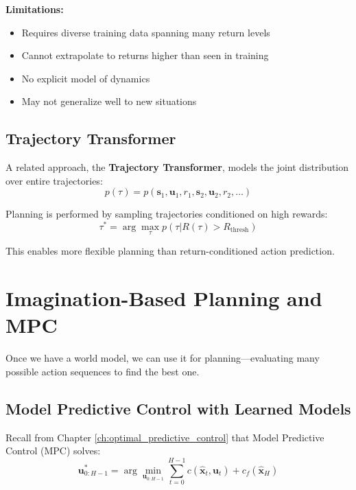 \textbf{Limitations:}
\begin{itemize}
    \item Requires diverse training data spanning many return levels
    \item Cannot extrapolate to returns higher than seen in training
    \item No explicit model of dynamics
    \item May not generalize well to new situations
\end{itemize}

\subsection{Trajectory Transformer}

A related approach, the \textbf{Trajectory Transformer}, models the joint distribution over entire trajectories:
\begin{equation}
p(\tau) = p(\mathbf{s}_1, \mathbf{u}_1, r_1, \mathbf{s}_2, \mathbf{u}_2, r_2, \ldots)
\end{equation}

Planning is performed by sampling trajectories conditioned on high rewards:
\begin{equation}
\tau^* = \arg\max_\tau p(\tau | R(\tau) > R_{\text{thresh}})
\end{equation}

This enables more flexible planning than return-conditioned action prediction.

\section{Imagination-Based Planning and MPC}
\label{sec:imagination_planning}

Once we have a world model, we can use it for planning---evaluating many possible action sequences to find the best one.

\subsection{Model Predictive Control with Learned Models}

Recall from Chapter \ref{ch:optimal_predictive_control} that Model Predictive Control (MPC) solves:
\begin{equation}
\mathbf{u}_{0:H-1}^* = \arg\min_{\mathbf{u}_{0:H-1}} \sum_{t=0}^{H-1} c(\hat{\mathbf{x}}_t, \mathbf{u}_t) + c_f(\hat{\mathbf{x}}_H)
\end{equation}

